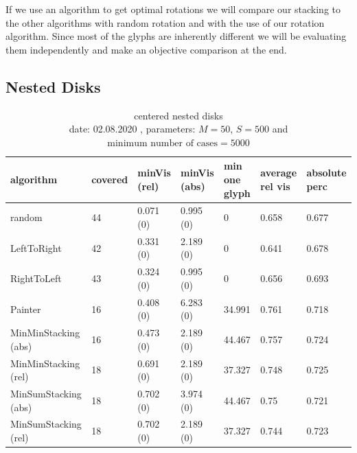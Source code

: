 \documentclass[a4paper,11pt]{article}
\begin{document}
If we use an algorithm to get optimal rotations we will compare our stacking to the other algorithms with random rotation and with the use of our rotation algorithm. Since most of the glyphs are inherently different we will be evaluating them independently and make an objective comparison at the end.


\subsection*{Nested Disks}

\begin{table}[h]
  \begin{center}
    \begin{tabular}{| l || p{1.3cm} | p{1.7cm} | p{1.7cm} | p{1.5cm} | p{1.5cm} | p{1.5cm} |}
      \hline
      algorithm            & covered & minVis (rel) & minVis (abs) & min one glyph & average rel vis & absolute perc \\
      \hline
      random               & 44      & 0.071 (0)    & 0.995 (0)    & 0             & 0.658           & 0.677         \\

      LeftToRight          & 42      & 0.331 (0)    & 2.189 (0)    & 0             & 0.641           & 0.678         \\

      RightToLeft          & 43      & 0.324 (0)    & 0.995 (0)    & 0             & 0.656           & 0.693         \\

      Painter              & 16      & 0.408 (0)    & 6.283 (0)    & 34.991        & 0.761           & 0.718         \\

      MinMinStacking (abs) & 16      & 0.473 (0)    & 2.189 (0)    & 44.467        & 0.757           & 0.724         \\

      MinMinStacking (rel) & 18      & 0.691 (0)    & 2.189 (0)    & 37.327        & 0.748           & 0.725         \\

      MinSumStacking (abs) & 18      & 0.702 (0)    & 3.974 (0)    & 44.467        & 0.75            & 0.721         \\

      MinSumStacking (rel) & 18      & 0.702 (0)    & 2.189 (0)    & 37.327        & 0.744           & 0.723         \\

      \hline
    \end{tabular}
  \end{center}
  \caption{centered nested disks\\
    date: 02.08.2020  , parameters: $M=50$, $S=500$ and $\text{minimum number of cases}=5000$  }
\end{table}
\end{document}
